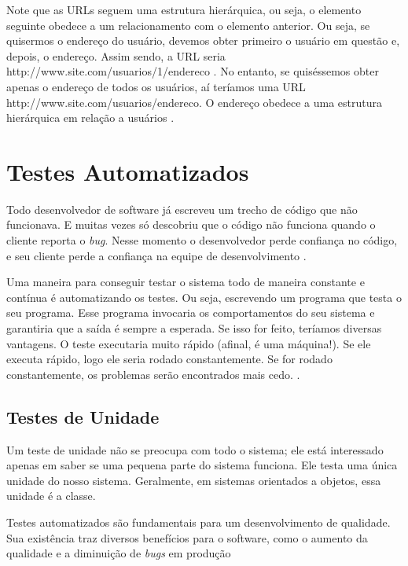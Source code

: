 Note que as URLs seguem uma estrutura hierárquica, ou seja, o elemento seguinte obedece a um relacionamento com o elemento anterior. Ou seja, se quisermos o endereço do usuário, devemos obter primeiro o usuário em questão e, depois, o endereço. Assim sendo, a URL seria http://www.site.com/usuarios/1/endereco . No entanto, se quiséssemos obter apenas o endereço de todos os usuários, aí teríamos uma URL http://www.site.com/usuarios/endereco. O endereço obedece a uma estrutura hierárquica em relação a usuários \cite{Saudate:2012}.


\section{Testes Automatizados} \label{sec:TestesAutomatizados}

Todo desenvolvedor de software já escreveu um trecho de código que não funcionava. E muitas vezes só descobriu que o código não funciona quando o cliente reporta o \textit{bug}. Nesse momento o desenvolvedor perde confiança no código, e seu cliente perde a confiança na equipe de desenvolvimento \cite{Aniche:2015}.

Uma maneira para conseguir testar o sistema todo de maneira constante e contínua é automatizando os testes. Ou seja, escrevendo um programa que testa o seu programa. Esse programa invocaria os comportamentos do seu sistema e garantiria que a saída é sempre a esperada. Se isso for feito, teríamos diversas vantagens. O teste executaria muito rápido (afinal, é uma máquina!). Se ele executa rápido, logo ele seria rodado constantemente. Se for rodado constantemente, os problemas serão encontrados mais cedo. \cite{Aniche:2012}.

\subsection{Testes de Unidade}\label{Testes Automatizados}

Um teste de unidade não se preocupa com todo o sistema; ele está interessado apenas em saber se uma pequena parte do sistema funciona. Ele testa uma única unidade do nosso sistema. Geralmente, em sistemas orientados a objetos, essa unidade é a classe.

Testes automatizados são fundamentais para um desenvolvimento de qualidade. Sua existência traz diversos benefícios para o software, como o aumento da qualidade e a diminuição de \textit{bugs} em produção \cite{Aniche:2012}


